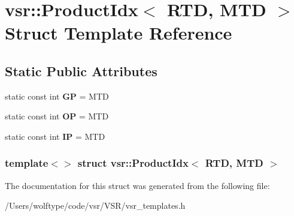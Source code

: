 \hypertarget{structvsr_1_1_product_idx_3_01_r_t_d_00_01_m_t_d_01_4}{\section{vsr\-:\-:Product\-Idx$<$ R\-T\-D, M\-T\-D $>$ Struct Template Reference}
\label{structvsr_1_1_product_idx_3_01_r_t_d_00_01_m_t_d_01_4}
}
\subsection*{Static Public Attributes}
\begin{DoxyCompactItemize}
\item 
\hypertarget{structvsr_1_1_product_idx_3_01_r_t_d_00_01_m_t_d_01_4_a94844a9642674b5d5cc8ce7a356276da}{static const int {\bfseries G\-P} = M\-T\-D}\label{structvsr_1_1_product_idx_3_01_r_t_d_00_01_m_t_d_01_4_a94844a9642674b5d5cc8ce7a356276da}

\item 
\hypertarget{structvsr_1_1_product_idx_3_01_r_t_d_00_01_m_t_d_01_4_a43ec95f64db68efe8d428187338f3854}{static const int {\bfseries O\-P} = M\-T\-D}\label{structvsr_1_1_product_idx_3_01_r_t_d_00_01_m_t_d_01_4_a43ec95f64db68efe8d428187338f3854}

\item 
\hypertarget{structvsr_1_1_product_idx_3_01_r_t_d_00_01_m_t_d_01_4_ab4d3ee1650bc840c5f06c34df666f883}{static const int {\bfseries I\-P} = M\-T\-D}\label{structvsr_1_1_product_idx_3_01_r_t_d_00_01_m_t_d_01_4_ab4d3ee1650bc840c5f06c34df666f883}

\end{DoxyCompactItemize}
\subsubsection*{template$<$$>$ struct vsr\-::\-Product\-Idx$<$ R\-T\-D, M\-T\-D $>$}



The documentation for this struct was generated from the following file\-:\begin{DoxyCompactItemize}
\item 
/\-Users/wolftype/code/vsr/\-V\-S\-R/vsr\-\_\-templates.\-h\end{DoxyCompactItemize}
